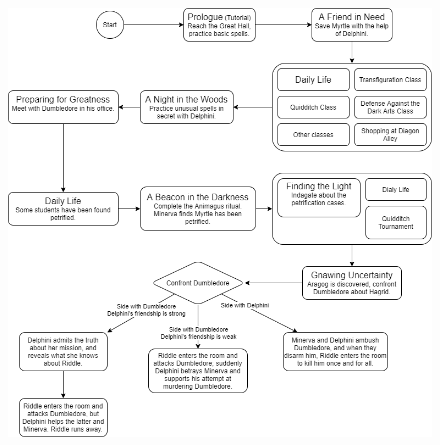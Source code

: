 \begin{figure}[H]
\includegraphics[max width=\textwidth]{../Pictures/Story/Story_flowchart.png}
\end{figure}

\pagebreak